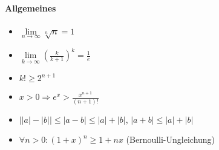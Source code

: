 \documentclass[paper=a3,paper=landscape, fontsize=9pt, DIV=30]{scrartcl}
\newcommand{\nat}{\mathbb{N}}
\begin{document}
\begin{multicols*}{4}
	
	\paragraph{Allgemeines}
		\begin{itemize}
			\item $\lim\limits_{n \rightarrow \infty}\sqrt[n]{n} = 1$
			\item $\lim\limits_{k \rightarrow \infty} (\frac{k}{k+1})^k = \frac{1}{e}$
			\item $k! \geq 2^{n+1}$
			\item $x>0 \Rightarrow e^x > \frac{x^{n+1}}{(n+1)!}$
			\item $\lvert \lvert a \rvert- \lvert b \rvert \rvert \leq \lvert a-b \rvert \leq \lvert a \rvert + \lvert b \rvert$, $\lvert a+b \rvert \leq \lvert a \rvert + \lvert b \rvert$
			\item $\forall n > 0: (1+x)^n \geq 1+nx$ (Bernoulli-Ungleichung)
		\end{itemize}
\end{multicols*}
\end{document}
